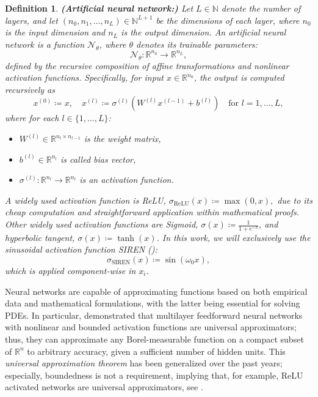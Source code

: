 \documentclass[12pt,openany]{book}
\newcommand{\R}{\mathbb{R}}
\theoremstyle{plainnormal}
\newtheorem{definition}[theorem]{Definition}
\theoremstyle{remark}
\begin{document}
\begin{definition}\textbf{(Artificial neural network:)}
   Let \( L \in \mathbb{N} \) denote the number of layers, and let \( (n_0, n_1, \dots, n_L) \in \mathbb{N}^{L+1} \) be the dimensions of each layer, where \( n_0 \) is the input dimension and \( n_L \) is the output dimension. An \textit{artificial neural network} is a function $\mathcal{N}_\theta$, where $\theta$ denotes its trainable parameters:
\[
\mathcal{N}_\theta: \mathbb{R}^{n_0} \rightarrow \mathbb{R}^{n_L},
\]
defined by the recursive composition of affine transformations and nonlinear activation functions. Specifically, for input \( x \in \mathbb{R}^{n_0} \), the output is computed recursively as
\[
x^{(0)} \coloneqq x, \quad x^{(l)} \coloneqq \sigma^{(l)}(W^{(l)} x^{(l-1)} + b^{(l)}) \quad \text{for } l = 1, \dots, L,
\]
where for each \( l \in \{1, \dots, L\} \):
\begin{itemize}
    \item \( W^{(l)} \in \mathbb{R}^{n_l \times n_{l-1}} \) is the weight matrix,
    \item \( b^{(l)} \in \mathbb{R}^{n_l} \) is called bias vector,
    \item \( \sigma^{(l)}: \mathbb{R}^{n_l} \rightarrow \mathbb{R}^{n_l} \) is an activation function.
\end{itemize}
A widely used activation function is \emph{ReLU}, $\sigma_{\text{ReLU}}(x) \coloneqq \max(0, x),$
due to its cheap computation and straightforward application within mathematical proofs. Other widely used activation functions are \emph{Sigmoid}, $\sigma(x) \coloneqq \frac{1}{1+e^{-x}} $, and \emph{hyperbolic tangent}, $\sigma(x) \coloneqq\tanh(x)$.
In this work, we will exclusively use the sinusoidal activation function \emph{SIREN} (\cite{sitzmann2020implicitneuralrepresentationsperiodic}): $$\sigma_{\text{SIREN}}(x) \coloneqq \sin(\omega_0 x),$$
which is applied component-wise in $x_i$.
\end{definition}
Neural networks are capable of approximating functions based on both empirical data and mathematical formulations, with the latter being essential for solving PDEs. In particular, \cite{HORNIK1989359} demonstrated that multilayer feedforward neural networks with nonlinear and bounded activation functions are universal approximators; thus, they can approximate any Borel-measurable function on a compact subset of $\R^n$ to arbitrary accuracy, given a sufficient number of hidden units. This \emph{universal approximation theorem} has been generalized over the past years; especially, boundedness is not a requirement, implying that, for example, ReLU activated networks are universal approximators, see \cite{petersen2018optimalapproximationpiecewisesmooth}. \par
\end{document}
